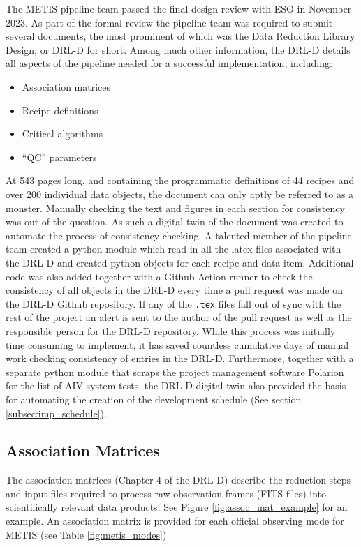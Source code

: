 \documentclass[a4paper]{spie}  %
\begin{document}
The METIS pipeline team passed the final design review with ESO in November 2023. 
As part of the formal review the pipeline team was required to submit several documents, the most prominent of which was the Data Reduction Library Design, or DRL-D for short\cite{DRLD}.
Among much other information, the DRL-D details all aspects of the pipeline needed for a successful implementation, including:

\begin{itemize}
    \item Association matrices
    \item Recipe definitions
    \item Critical algorithms
    \item ``QC'' parameters
\end{itemize}

At 543 pages long, and containing the programmatic definitions of 44 recipes and over 200 individual data objects, the document can only aptly be referred to as a monster.
Manually checking the text and figures in each section for consistency was out of the question.
As such a digital twin of the document was created to automate the process of consistency checking.
A talented member of the pipeline team created a python module which read in all the latex files associated with the DRL-D and created python objects for each recipe and data item. 
Additional code was also added together with a Github Action runner to check the consistency of all objects in the DRL-D every time a pull request was made on the DRL-D Github repository.
If any of the \verb+.tex+ files fall out of sync with the rest of the project an alert is sent to the author of the pull request as well as the responsible person for the DRL-D repository.
While this process was initially time consuming to implement, it has saved countless cumulative days of manual work checking consistency of entries in the DRL-D.
Furthermore, together with a separate python module that scraps the project management software Polarion for the list of AIV system tests, the DRL-D digital twin also provided the basis for automating the creation of the development schedule (See section \ref{subsec:imp_schedule}). 

\subsection{Association Matrices}

The association matrices (Chapter 4 of the DRL-D) describe the reduction steps and input files required to process raw observation frames (FITS files) into scientifically relevant data products. 
See Figure \ref{fig:assoc_mat_example} for an example. 
An association matrix is provided for each official observing mode for METIS (see Table \ref{fig:metis_modes})
\end{document}
